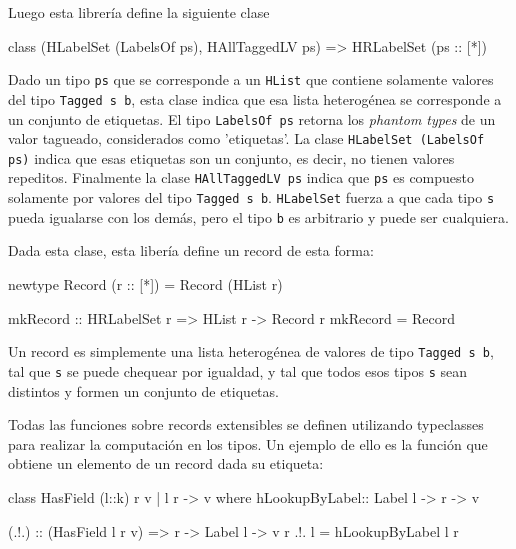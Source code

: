 Luego esta librería define la siguiente clase
\begin{code}
class (HLabelSet (LabelsOf ps), HAllTaggedLV ps) => 
  HRLabelSet (ps :: [*])
\end{code}

Dado un tipo \texttt{ps} que se corresponde a un \texttt{HList} que contiene solamente valores del tipo \texttt{Tagged s b}, esta clase indica que esa lista heterogénea se corresponde a un conjunto de etiquetas.
El tipo \texttt{LabelsOf ps} retorna los \textit{phantom types} de un valor tagueado, considerados como 'etiquetas'. La clase \texttt{HLabelSet (LabelsOf ps)} indica que esas etiquetas son un conjunto, es decir, no tienen valores repeditos. Finalmente la clase \texttt{HAllTaggedLV ps} indica que \texttt{ps} es compuesto solamente por valores del tipo \texttt{Tagged s b}.
\texttt{HLabelSet} fuerza a que cada tipo \texttt{s} pueda igualarse con los demás, pero el tipo \texttt{b} es arbitrario y puede ser cualquiera.

Dada esta clase, esta libería define un record de esta forma:

\begin{code}
newtype Record (r :: [*]) = Record (HList r)

mkRecord :: HRLabelSet r => HList r -> Record r
mkRecord = Record
\end{code}

Un record es simplemente una lista heterogénea de valores de tipo \texttt{Tagged s b}, tal que \texttt{s} se puede chequear por igualdad, y tal que todos esos tipos \texttt{s} sean distintos y formen un conjunto de etiquetas.

Todas las funciones sobre records extensibles se definen utilizando typeclasses para realizar la computación en los tipos.
Un ejemplo de ello es la función que obtiene un elemento de un record dada su etiqueta:

\begin{code}
class HasField (l::k) r v | l r -> v where
  hLookupByLabel:: Label l -> r -> v

(.!.) :: (HasField l r v) => r -> Label l -> v
r .!. l =  hLookupByLabel l r
\end{code}
